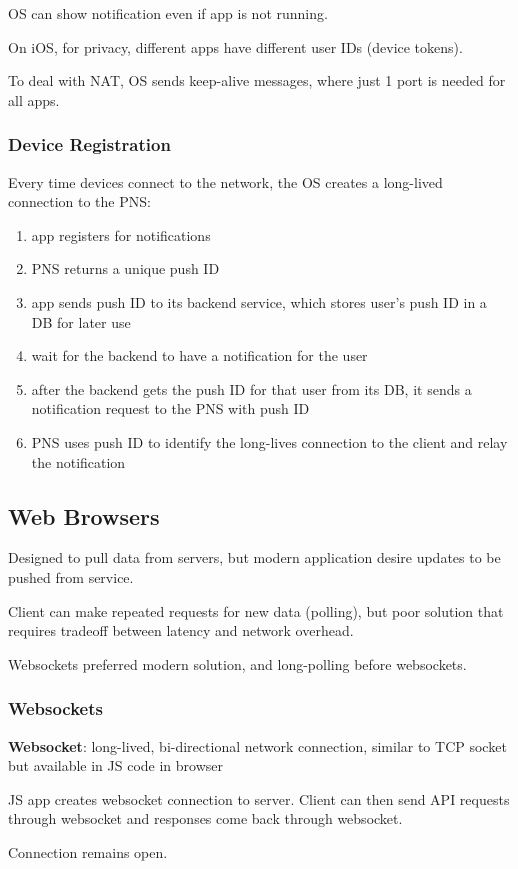 \documentclass[11pt]{article}
\begin{document}
OS can show notification even if app is not running.

On iOS, for privacy, different apps have different user IDs (device tokens).

To deal with NAT, OS sends keep-alive messages, where just 1 port is needed for all apps.
\subsubsection{Device Registration}
\label{sec:org280b7ba}
Every time devices connect to the network, the OS creates a long-lived connection to the PNS:
\begin{enumerate}
\item app registers for notifications
\item PNS returns a unique push ID
\item app sends push ID to its backend service, which stores user's push ID in a DB for later use
\item wait for the backend to have a notification for the user
\item after the backend gets the push ID for that user from its DB, it sends a notification request
to the PNS with push ID
\item PNS uses push ID to identify the long-lives connection to the client and relay the notification
\end{enumerate}
\subsection{Web Browsers}
\label{sec:org882fe09}
Designed to pull data from servers, but modern application desire updates to be pushed from service.

Client can make repeated requests for new data (polling), but poor solution that requires tradeoff
between latency and network overhead.

Websockets preferred modern solution, and long-polling before websockets.
\subsubsection{Websockets}
\label{sec:org0c07af8}
\textbf{Websocket}: long-lived, bi-directional network connection, similar to TCP socket but available
in JS code in browser

JS app creates websocket connection to server.
Client can then send API requests through websocket and responses come back through websocket.

Connection remains open.
\end{document}
